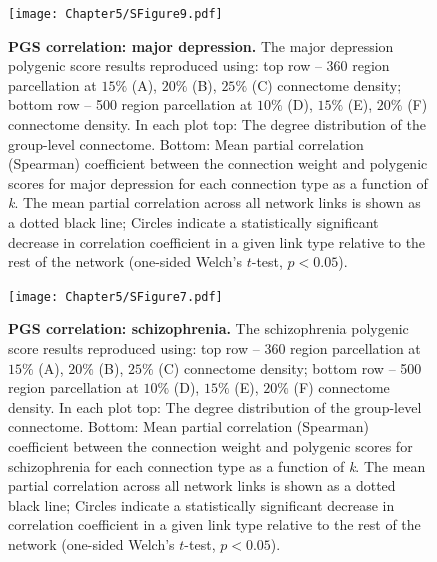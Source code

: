 \begin{figure}[h!]
\begin{center}
\texttt{[image: Chapter5/SFigure9.pdf]}%
\end{center}
\caption{\textbf{PGS correlation: major depression.}
The major depression polygenic score results reproduced using: top row --  360 region parcellation at $15\%$ (A), $20\%$ (B), $25\%$ (C) connectome density; bottom row -- 500 region parcellation at $10\%$ (D), $15\%$ (E), $20\%$ (F) connectome density. In each plot top: The degree distribution of the group-level connectome. Bottom: Mean partial correlation (Spearman) coefficient between the connection weight and polygenic scores for major depression for each connection type as a function of \textit{k}. The mean partial correlation across all network links is shown as a dotted black line; Circles indicate a statistically significant decrease in correlation coefficient in a given link type relative to the rest of the network (one-sided Welch's $t$-test, $p < 0.05$).}
\label{fig:Ch5SFig9}
\end{figure}

\begin{figure}[h!]
\begin{center}
\texttt{[image: Chapter5/SFigure7.pdf]}%
\end{center}
\caption{\textbf{PGS correlation: schizophrenia.}
The schizophrenia polygenic score results reproduced using: top row -- 360 region parcellation at $15\%$ (A), $20\%$ (B), $25\%$ (C) connectome density; bottom row -- 500 region parcellation at $10\%$ (D), $15\%$ (E), $20\%$ (F) connectome density. In each plot top: The degree distribution of the group-level connectome. Bottom: Mean partial correlation (Spearman) coefficient between the connection weight and polygenic scores for schizophrenia for each connection type as a function of \textit{k}. The mean partial correlation across all network links is shown as a dotted black line; Circles indicate a statistically significant decrease in correlation coefficient in a given link type relative to the rest of the network (one-sided Welch's $t$-test, $p < 0.05$).}
\label{fig:Ch5SFig7}
\end{figure}

